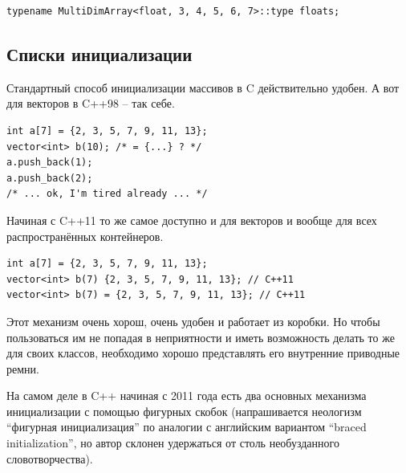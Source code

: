 \documentclass[a4paper,12pt,oneside]{book}
\newif\ifanswers
\begin{document}
\begin{lstlisting}
typename MultiDimArray<float, 3, 4, 5, 6, 7>::type floats;
\end{lstlisting}

\ifanswers
Правильный ответ: да и даже не так сложно

\begin{lstlisting}
template <class T, size_t I, size_t... J>
struct MultiDimArray 
{
  using Nested = typename MultiDimArray<T, J...>::type;
  using type = std::array<Nested, I>;
};
 
template <class T, size_t I>
struct MultiDimArray<T, I> 
{
  using type = std::array<T, I>;
};
\end{lstlisting}

К этому моменту курса это должно стать обычной задачей на вариабельные шаблоны.
\fi

\subsection{Списки инициализации}\label{subsub:initializerlists}

Стандартный способ инициализации массивов в C действительно удобен. А вот для векторов в C++98 -- так себе.

\begin{lstlisting}
int a[7] = {2, 3, 5, 7, 9, 11, 13};
vector<int> b(10); /* = {...} ? */
a.push_back(1);
a.push_back(2);
/* ... ok, I'm tired already ... */
\end{lstlisting}

Начиная с C++11 то же самое доступно и для векторов и вообще для всех распространённых контейнеров.

\begin{lstlisting}
int a[7] = {2, 3, 5, 7, 9, 11, 13};
vector<int> b(7) {2, 3, 5, 7, 9, 11, 13}; // C++11
vector<int> b(7) = {2, 3, 5, 7, 9, 11, 13}; // C++11
\end{lstlisting}

Этот механизм очень хорош, очень удобен и работает из коробки. Но чтобы пользоваться им не попадая в неприятности и иметь возможность делать то же для своих классов, необходимо хорошо представлять его внутренние приводные ремни.

На самом деле в C++ начиная с 2011 года есть два основных механизма инициализации с помощью фигурных скобок (напрашивается неологизм ``фигурная инициализация'' по аналогии с английским вариантом ``braced initialization'', но автор склонен удержаться от столь необузданного словотворчества).
\end{document}
